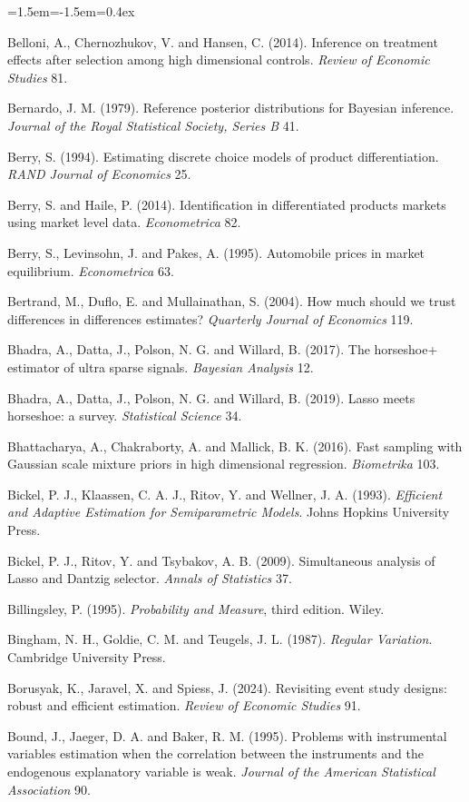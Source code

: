 \begin{list}{}{\leftmargin=1.5em\itemindent=-1.5em\itemsep=0.4ex}
\item Belloni, A., Chernozhukov, V. and Hansen, C. (2014). Inference on treatment effects after selection among high dimensional controls. \emph{Review of Economic Studies} 81.
\item Bernardo, J. M. (1979). Reference posterior distributions for Bayesian inference. \emph{Journal of the Royal Statistical Society, Series B} 41.
\item Berry, S. (1994). Estimating discrete choice models of product differentiation. \emph{RAND Journal of Economics} 25.
\item Berry, S. and Haile, P. (2014). Identification in differentiated products markets using market level data. \emph{Econometrica} 82.
\item Berry, S., Levinsohn, J. and Pakes, A. (1995). Automobile prices in market equilibrium. \emph{Econometrica} 63.
\item Bertrand, M., Duflo, E. and Mullainathan, S. (2004). How much should we trust differences in differences estimates? \emph{Quarterly Journal of Economics} 119.
\item Bhadra, A., Datta, J., Polson, N. G. and Willard, B. (2017). The horseshoe+ estimator of ultra sparse signals. \emph{Bayesian Analysis} 12.
\item Bhadra, A., Datta, J., Polson, N. G. and Willard, B. (2019). Lasso meets horseshoe: a survey. \emph{Statistical Science} 34.
\item Bhattacharya, A., Chakraborty, A. and Mallick, B. K. (2016). Fast sampling with Gaussian scale mixture priors in high dimensional regression. \emph{Biometrika} 103.
\item Bickel, P. J., Klaassen, C. A. J., Ritov, Y. and Wellner, J. A. (1993). \emph{Efficient and Adaptive Estimation for Semiparametric Models}. Johns Hopkins University Press.
\item Bickel, P. J., Ritov, Y. and Tsybakov, A. B. (2009). Simultaneous analysis of Lasso and Dantzig selector. \emph{Annals of Statistics} 37.
\item Billingsley, P. (1995). \emph{Probability and Measure}, third edition. Wiley.
\item Bingham, N. H., Goldie, C. M. and Teugels, J. L. (1987). \emph{Regular Variation}. Cambridge University Press.
\item Borusyak, K., Jaravel, X. and Spiess, J. (2024). Revisiting event study designs: robust and efficient estimation. \emph{Review of Economic Studies} 91.
\item Bound, J., Jaeger, D. A. and Baker, R. M. (1995). Problems with instrumental variables estimation when the correlation between the instruments and the endogenous explanatory variable is weak. \emph{Journal of the American Statistical Association} 90.

\end{list}

